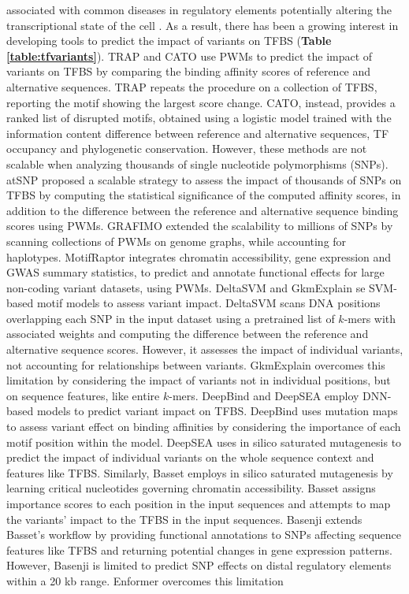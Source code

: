 \documentclass[a4paper, titlepage, openright]{book}
\newcommand{\grafimo}{GRAFIMO\xspace}
\newcommand{\motifraptor}{MotifRaptor\xspace}
\begin{document}
associated with common diseases in regulatory elements \citep{maurano2012systematic} potentially altering the transcriptional state of the cell \citep{deplancke2016genetics}. As a result, there has been a growing interest in developing tools to predict the impact of variants on TFBS (\textbf{Table \ref{table:tfvariants}}). TRAP \citep{thomas2011transcription} and CATO \citep{maurano2015large} use PWMs to predict the impact of variants on TFBS by comparing the binding affinity scores of reference and alternative sequences. TRAP repeats the procedure on a collection of TFBS, reporting the motif showing the largest score change. CATO, instead, provides a ranked list of disrupted motifs, obtained using a logistic model trained with the information content difference between reference and alternative sequences, TF occupancy and phylogenetic conservation. However, these methods are not scalable when analyzing thousands of single nucleotide polymorphisms (SNPs). atSNP \citep{zuo2015atsnp} proposed a scalable strategy to assess the impact of thousands of SNPs on TFBS by computing the statistical significance of the computed affinity scores, in addition to the difference between the reference and alternative sequence binding scores using PWMs. \grafimo \citep{tognon2021grafimo} extended the scalability to millions of SNPs by scanning collections of PWMs on genome graphs, while accounting for haplotypes. \motifraptor \citep{yao2021motif} integrates chromatin accessibility, gene expression and GWAS summary statistics, to predict and annotate functional effects for large non-coding variant datasets, using PWMs. DeltaSVM \citep{lee2015method} and GkmExplain \citep{shrikumar2019gkmexplain} se SVM-based motif models to assess variant impact. DeltaSVM scans DNA positions overlapping each SNP in the input dataset using a pretrained list of $k$-mers with associated weights and computing the difference between the reference and alternative sequence scores. However, it assesses the impact of individual variants, not accounting for relationships between variants. GkmExplain overcomes this limitation by considering the impact of variants not in individual positions, but on sequence features, like entire $k$-mers. DeepBind \citep{alipanahi2015predicting} and DeepSEA \citep{zhou2015predicting}  employ DNN-based models to predict variant impact on TFBS. DeepBind uses mutation maps to assess variant effect on binding affinities by considering the importance of each motif position within the model. DeepSEA uses in silico saturated mutagenesis to predict the impact of individual variants on the whole sequence context and features like TFBS. Similarly, Basset \citep{kelley2016basset} employs in silico saturated mutagenesis by learning critical nucleotides governing chromatin accessibility. Basset assigns importance scores to each position in the input sequences and attempts to map the variants’ impact to the TFBS in the input sequences. Basenji  \citep{kelley2018sequential} extends Basset’s workflow by providing functional annotations to SNPs affecting sequence features like TFBS and returning potential changes in gene expression patterns. However, Basenji is limited to predict SNP effects on distal regulatory elements within a 20 kb range. Enformer \citep{avsec2021effective} overcomes this limitation 
\end{document}
